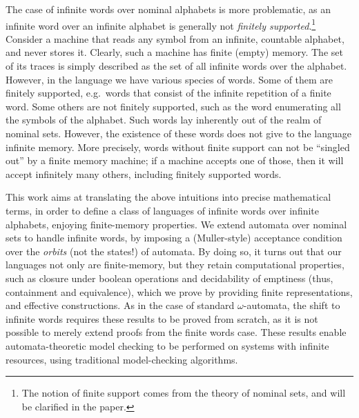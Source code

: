 The case of infinite words over nominal alphabets is more problematic, as an infinite word over an infinite alphabet is generally not \emph{finitely supported}.\footnote{The notion of finite support comes from the theory of nominal sets, and will be clarified in the paper.} Consider a machine that reads any symbol from an infinite, countable alphabet, and never stores it. Clearly, such a machine has finite (empty) memory. The set of its traces is simply described as the set of all infinite words over the alphabet. However, in the language we have various species of words. Some of them are finitely supported, e.g.\ words that consist of the infinite repetition of a finite word. Some others are not finitely supported, such as the word enumerating all the symbols of the alphabet. Such words lay inherently out of the realm of nominal sets. However, the existence of these words does not give to the language infinite memory. More precisely,  words without finite support can not be ``singled out'' by a finite memory machine; if a machine accepts one of those, then it will accept infinitely many others, including finitely supported words.  

This work aims at translating the above intuitions into precise mathematical terms, in order to define a class of languages of infinite words over infinite alphabets, enjoying finite-memory properties. We extend automata over nominal sets to handle infinite words, by imposing a (Muller-style) acceptance condition 
over the \emph{orbits} (not the states!) of automata. By doing so, it turns out that our languages not only are finite-memory, but they retain computational properties, such as closure under boolean operations and decidability of emptiness (thus, containment and equivalence), which we prove by providing finite representations, and effective constructions. As in the case of standard $\omega$-automata, the shift to infinite words requires these results to be proved from scratch, as it is not possible to merely extend proofs from the finite words case. These results enable automata-theoretic model checking to be performed on systems with infinite resources, using traditional model-checking algorithms. 

